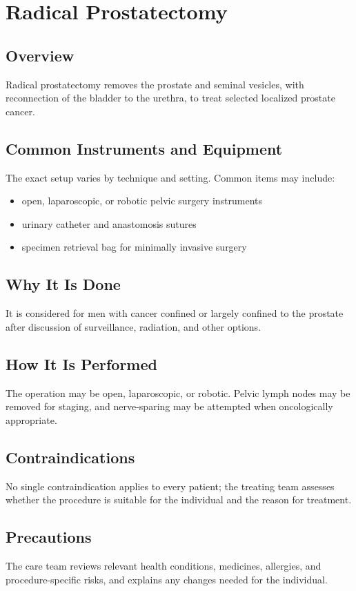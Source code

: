 \chapter{Radical Prostatectomy}
\section*{Overview}
Radical prostatectomy removes the prostate and seminal vesicles, with reconnection of the bladder to the urethra, to treat selected localized prostate cancer.
\section*{Common Instruments and Equipment}
The exact setup varies by technique and setting. Common items may include:
\begin{itemize}[nosep,leftmargin=*]
  \item open, laparoscopic, or robotic pelvic surgery instruments
  \item urinary catheter and anastomosis sutures
  \item specimen retrieval bag for minimally invasive surgery
\end{itemize}

\section*{Why It Is Done}
It is considered for men with cancer confined or largely confined to the prostate after discussion of surveillance, radiation, and other options.
\section*{How It Is Performed}
The operation may be open, laparoscopic, or robotic. Pelvic lymph nodes may be removed for staging, and nerve-sparing may be attempted when oncologically appropriate.
\section*{Contraindications}
No single contraindication applies to every patient; the treating team assesses whether the procedure is suitable for the individual and the reason for treatment.

\section*{Precautions}
The care team reviews relevant health conditions, medicines, allergies, and procedure-specific risks, and explains any changes needed for the individual.


